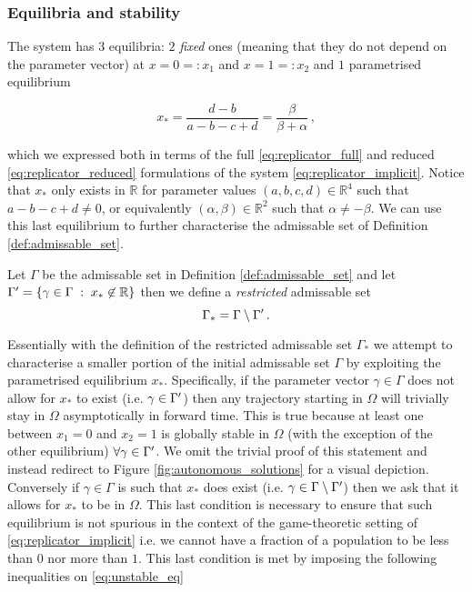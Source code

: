 \documentclass[../main.tex]{subfiles}
\begin{document}
\subsubsection{Equilibria and stability}\label{subsubsec:equilibria}

The system has $3$ equilibria: $2$ \textit{fixed} ones (meaning that they do not depend on the parameter vector) at $x=0=:x_{1}$ and $x=1=:x_{2}$ and $1$ parametrised equilibrium 

\begin{equation}\label{eq:unstable_eq}
     x_{*} = \frac{d-b}{a-b-c+d} = \frac{\beta}{\beta + \alpha}\,,
\end{equation}

which we expressed both in terms of the full \eqref{eq:replicator_full} and reduced \eqref{eq:replicator_reduced} formulations of the system \eqref{eq:replicator_implicit}.
Notice that $x_{*}$ only exists in $\mathbb{R}$ for parameter values $(a,b,c,d)\in \mathbb{R}^{4}$ such that $a - b - c + d \neq 0$, or equivalently $(\alpha,\beta)\in \mathbb{R}^{2}$ such that $\alpha\neq-\beta$.
We can use this last equilibrium to further characterise the admissable set of Definition \ref{def:admissable_set}.

\begin{definition}[]\label{def:restricted_admissable_set}
        Let $\Gamma$ be the admissable set in Definition \ref{def:admissable_set} and let $\Gamma' = \{\gamma\in\Gamma \;:\; x_{*}\not\in\mathbb{R}\}$ then we define a \textit{restricted} admissable set
        \begin{equation*}
                \Gamma_{*} = \Gamma\setminus\Gamma'\,. 
        \end{equation*}
\end{definition}

Essentially with the definition of the restricted admissable set $\Gamma_{*}$ we attempt to characterise a smaller portion of the initial admissable set $\Gamma$ by exploiting the parametrised equilibrium $x_{*}$.
Specifically, if the parameter vector $\gamma\in\Gamma$ does not allow for $x_{*}$ to exist (i.e. $\gamma\in \Gamma'$) then any trajectory starting in $\Omega$ will trivially stay in $\Omega$  asymptotically in forward time.
This is true because at least one between $x_{1} = 0$ and $x_{2} = 1$ is globally stable in $\Omega$ (with the exception of the other equilibrium) $\forall\gamma\in\Gamma'$.
We omit the trivial proof of this statement and instead redirect to Figure \ref{fig:autonomous_solutions} for a visual depiction.
Conversely if $\gamma\in\Gamma$ is such that $x_{*}$ does exist (i.e. $\gamma\in\Gamma\setminus \Gamma'$) then we ask that it allows for $x_{*}$ to be in $\Omega$.
This last condition is necessary to ensure that such equilibrium is not spurious in the context of the game-theoretic setting of \eqref{eq:replicator_implicit} i.e. we cannot have a fraction of a population to be less than $0$ nor more than $1$.
This last condition is met by imposing the following inequalities on \eqref{eq:unstable_eq}
\end{document}
